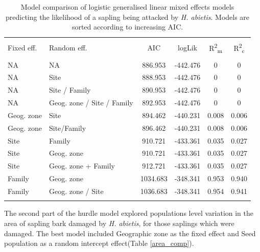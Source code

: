 \documentclass[a4paper, 11pt]{article}
\begin{document}
\begin{table}[!htbp]
  \caption{Model comparison of logistic generalised linear mixed effects models predicting the likelihood of a sapling being attacked by \textit{H. abietis}. Models are sorted according to increasing AIC.} 
  \label{} 
\centering
\begin{tabular}{@{\extracolsep{5pt}} llS[table-format=3.2]S[table-format=3.2]S[table-format=3.2]S[table-format=3.2]} 
\\[-1.8ex]\hline 
\hline \\[-1.8ex] 
Fixed eff. & Random eff. & {AIC} & {logLik} & {R\textsuperscript{2}\textsubscript{m}} & {R\textsuperscript{2}\textsubscript{c}} \\ 
\hline \\[-1.8ex] 
NA & NA & 886.953 & -442.476 & 0 & 0 \\ 
NA & Site & 888.953 & -442.476 & 0 & 0 \\ 
NA & Site / Family & 890.953 & -442.476 & 0 & 0 \\ 
NA & Geog. zone / Site / Family & 892.953 & -442.476 & 0 & 0 \\ 
Geog. zone & Site & 894.462 & -440.231 & 0.008 & 0.006 \\ 
Geog. zone & Site/Family & 896.462 & -440.231 & 0.008 & 0.006 \\ 
Site & Family & 910.721 & -433.361 & 0.035 & 0.027 \\ 
Site & Geog. zone & 910.721 & -433.361 & 0.035 & 0.027 \\ 
Site & Geog. zone + Family & 912.721 & -433.361 & 0.035 & 0.027 \\ 
Family & Geog. zone & 1034.683 & -348.341 & 0.953 & 0.940 \\ 
Family & Geog. zone / Site & 1036.683 & -348.341 & 0.954 & 0.941 \\ 
\hline \\[-1.8ex] 
\end{tabular} 
\end{table} 

The second part of the hurdle model explored populations level variation in the area of sapling bark damaged by \textit{H. abietis}, for those saplings which were damaged. The best model included Geographic zone as the fixed effect and Seed population as a random intercept effect(Table \ref{area_comp}).
\end{document}
